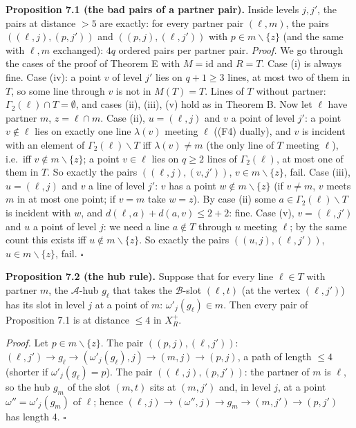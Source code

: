 \documentclass[
  11pt,
]{article}
\begin{document}
\textbf{Proposition 7.1 (the bad pairs of a partner pair).} Inside
levels \(j,j'\), the pairs at distance \(>5\) are exactly: for every
partner pair \((\ell,m)\), the pairs \(((\ell,j),(p,j'))\) and
\(((p,j),(\ell,j'))\) with \(p\in m\smallsetminus\{z\}\) (and the same
with \(\ell,m\) exchanged): \(4q\) ordered pairs per partner pair.
\emph{Proof.} We go through the cases of the proof of Theorem E with
\(M = \mathrm{id}\) and \(R = T\). Case (i) is always fine. Case (iv): a
point \(v\) of level \(j'\) lies on \(q+1\ge 3\) lines, at most two of
them in \(T\), so some line through \(v\) is not in \(M(T) = T\). Lines
of \(T\) without partner: \(\Gamma_2(\ell)\cap T = \emptyset\), and
cases (ii), (iii), (v) hold as in Theorem B. Now let \(\ell\) have
partner \(m\), \(z = \ell\cap m\). Case (ii), \(u = (\ell,j)\) and \(v\)
a point of level \(j'\): a point \(v\notin\ell\) lies on exactly one
line \(\lambda(v)\) meeting \(\ell\) ((F4) dually), and \(v\) is
incident with an element of \(\Gamma_2(\ell)\smallsetminus T\) iff
\(\lambda(v)\ne m\) (the only line of \(T\) meeting \(\ell\)), i.e.~iff
\(v\notin m\smallsetminus\{z\}\); a point \(v\in\ell\) lies on
\(q\ge 2\) lines of \(\Gamma_2(\ell)\), at most one of them in \(T\). So
exactly the pairs \(((\ell,j),(v,j'))\), \(v\in m\smallsetminus\{z\}\),
fail. Case (iii), \(u = (\ell,j)\) and \(v\) a line of level \(j'\):
\(v\) has a point \(w\notin m\smallsetminus\{z\}\) (if \(v\ne m\), \(v\)
meets \(m\) in at most one point; if \(v = m\) take \(w = z\)). By case
(ii) some \(a\in\Gamma_2(\ell)\smallsetminus T\) is incident with \(w\),
and \(d(\ell,a)+d(a,v)\le 2+2\): fine. Case (v), \(v = (\ell,j')\) and
\(u\) a point of level \(j\): we need a line \(a\notin T\) through \(u\)
meeting \(\ell\); by the same count this exists iff
\(u\notin m\smallsetminus\{z\}\). So exactly the pairs
\(((u,j),(\ell,j'))\), \(u\in m\smallsetminus\{z\}\), fail. \(\square\)

\textbf{Proposition 7.2 (the hub rule).} Suppose that for every line
\(\ell\in T\) with partner \(m\), the \(\mathcal A\)-hub \(g_\ell\) that
takes the \(\mathcal B\)-slot \((\ell,t)\) (at the vertex \((\ell,j')\))
has its slot in level \(j\) at a point of \(m\):
\(\omega'_j(g_\ell)\in m\). Then every pair of Proposition 7.1 is at
distance \(\le 4\) in \(X_R^+\).

\emph{Proof.} Let \(p\in m\smallsetminus\{z\}\). The pair
\(((p,j),(\ell,j'))\):
\((\ell,j')\to g_\ell\to(\omega'_j(g_\ell),j)\to(m,j)\to(p,j)\), a path
of length \(\le 4\) (shorter if \(\omega'_j(g_\ell) = p\)). The pair
\(((\ell,j),(p,j'))\): the partner of \(m\) is \(\ell\), so the hub
\(g_m\) of the slot \((m,t)\) sits at \((m,j')\) and, in level \(j\), at
a point \(\omega'' = \omega'_j(g_m)\) of \(\ell\); hence
\((\ell,j)\to(\omega'',j)\to g_m\to(m,j')\to(p,j')\) has length 4.
\(\square\)
\end{document}
